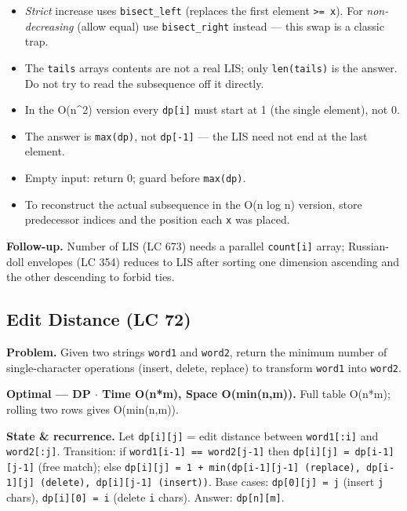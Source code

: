\documentclass[11pt]{article}
\providecommand{\tightlist}{\setlength{\itemsep}{1pt}\setlength{\parskip}{0pt}}
\begin{document}
\begin{itemize}
\tightlist
\item
  \emph{Strict} increase uses \texttt{bisect\_left} (replaces the first element \texttt{\textgreater{}=\ x}). For \emph{non-decreasing} (allow equal) use \texttt{bisect\_right} instead --- this swap is a classic trap.
\item
  The \texttt{tails} array\textquotesingle s contents are not a real LIS; only \texttt{len(tails)} is the answer. Do not try to read the subsequence off it directly.
\item
  In the O(n\^{}2) version every \texttt{dp{[}i{]}} must start at 1 (the single element), not 0.
\item
  The answer is \texttt{max(dp)}, not \texttt{dp{[}-1{]}} --- the LIS need not end at the last element.
\item
  Empty input: return 0; guard before \texttt{max(dp)}.
\item
  To reconstruct the actual subsequence in the O(n log n) version, store predecessor indices and the position each \texttt{x} was placed.
\end{itemize}

\textbf{Follow-up.} Number of LIS (LC 673) needs a parallel \texttt{count{[}i{]}} array; Russian-doll envelopes (LC 354) reduces to LIS after sorting one dimension ascending and the other descending to forbid ties.

\subsection{Edit Distance (LC 72)}\label{edit-distance-lc-72}

\textbf{Problem.} Given two strings \texttt{word1} and \texttt{word2}, return the minimum number of single-character operations (insert, delete, replace) to transform \texttt{word1} into \texttt{word2}.

\textbf{Optimal --- DP \(\cdot\) Time O(n*m), Space O(min(n,m)).} Full table O(n*m); rolling two rows gives O(min(n,m)).

\textbf{State \& recurrence.} Let \texttt{dp{[}i{]}{[}j{]}} = edit distance between \texttt{word1{[}:i{]}} and \texttt{word2{[}:j{]}}. Transition: if \texttt{word1{[}i-1{]}\ ==\ word2{[}j-1{]}} then \texttt{dp{[}i{]}{[}j{]}\ =\ dp{[}i-1{]}{[}j-1{]}} (free match); else \texttt{dp{[}i{]}{[}j{]}\ =\ 1\ +\ min(dp{[}i-1{]}{[}j-1{]}\ (replace),\ dp{[}i-1{]}{[}j{]}\ (delete),\ dp{[}i{]}{[}j-1{]}\ (insert))}. Base cases: \texttt{dp{[}0{]}{[}j{]}\ =\ j} (insert \texttt{j} chars), \texttt{dp{[}i{]}{[}0{]}\ =\ i} (delete \texttt{i} chars). Answer: \texttt{dp{[}n{]}{[}m{]}}.
\end{document}
